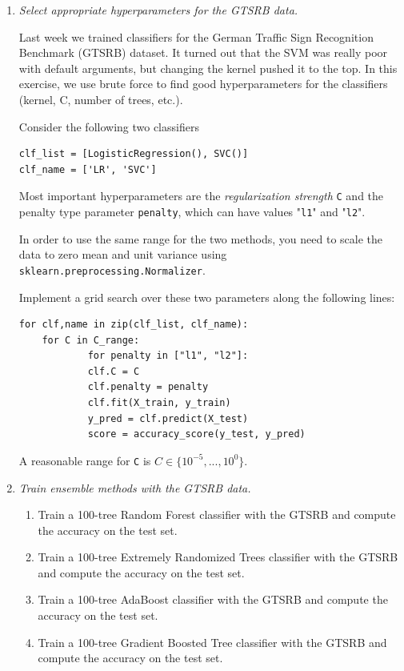 \documentclass[a4paper,12pt]{scrartcl}
\newcommand{\python}{{\fbox{\texttt{\bfseries python}}\quad}}
\begin{document}
\begin{enumerate}
\item \python \emph{Select appropriate hyperparameters for the GTSRB data.}

Last week we trained classifiers for the German Traffic Sign
Recognition Benchmark (GTSRB) dataset. It turned out that the SVM was
really poor with default arguments, but changing the kernel pushed it
to the top. In this exercise, we use brute force to find good hyperparameters
for the classifiers (kernel, C, number of trees, etc.).

Consider the following two classifiers
	\begin{verbatim}
clf_list = [LogisticRegression(), SVC()]
clf_name = ['LR', 'SVC']
	\end{verbatim}
	Most important hyperparameters are the \emph{regularization strength} \verb+C+ and
	the penalty type parameter \verb+penalty+, which can have values "\verb+l1+" and "\verb+l2+".
	
	In order to use the same range for the two methods, you need to scale the data to
	zero mean and unit variance using \verb+sklearn.preprocessing.Normalizer+.
	
	Implement
	a grid search over these two parameters along the following lines:
	\begin{verbatim}
for clf,name in zip(clf_list, clf_name):
    for C in C_range:
		    for penalty in ["l1", "l2"]:
            clf.C = C
            clf.penalty = penalty
            clf.fit(X_train, y_train)
            y_pred = clf.predict(X_test)
            score = accuracy_score(y_test, y_pred)
\end{verbatim}
A reasonable range for \verb+C+ is $C\in\{10^{-5},...,10^{0}\}$.

\item \python \emph{Train ensemble methods with the GTSRB data.}

\begin{enumerate}
\item Train a 100-tree Random Forest classifier with the GTSRB and compute the accuracy on the test set.
\item Train a 100-tree Extremely Randomized Trees classifier with the GTSRB and compute the accuracy on the test set.
\item Train a 100-tree AdaBoost classifier with the GTSRB and compute the accuracy on the test set.
\item Train a 100-tree Gradient Boosted Tree classifier with the GTSRB and compute the accuracy on the test set.
\end{enumerate}


\end{enumerate}
\end{document}
